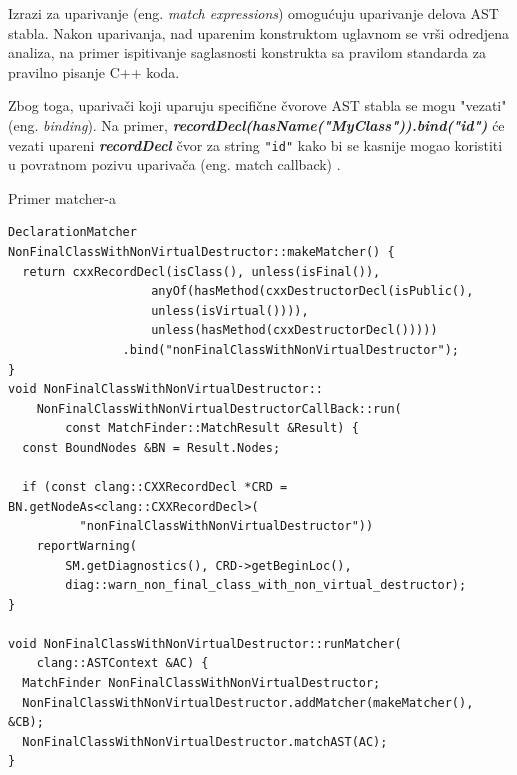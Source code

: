 \documentclass[12pt,oneside]{memoir}
\begin{document}
Izrazi za uparivanje (eng. \textit{match expressions}) omogu\'{c}uju uparivanje delova AST stabla. Nakon uparivanja, nad uparenim konstruktom uglavnom se vr\v{s}i odredjena analiza, na primer ispitivanje saglasnosti konstrukta sa pravilom standarda za pravilno pisanje C++ koda.
\par
Zbog toga, upariva\v{c}i koji uparuju specifi\v{c}ne čvorove AST stabla se mogu "vezati" (eng. \textit{binding}). Na primer, \textbf{\textit{recordDecl(hasName("MyClass")).bind("id")}} će vezati upareni \textbf{\textit{recordDecl}} čvor za string \texttt{"id"} kako bi se kasnije mogao koristiti u povratnom pozivu upariva\v{c}a (eng. match callback) \cite{matchers}.

\begin{primer}
Primer matcher-a 
\end{primer}
\begin{lstlisting}[caption={Primer matcher-a (koji pronalazi sve klase koje nisu obeležene atributom \texttt{final} i čiji destruktor nije virtuelan), CallBack klase i poziva matchera},frame=single, label=simple]
DeclarationMatcher NonFinalClassWithNonVirtualDestructor::makeMatcher() {
  return cxxRecordDecl(isClass(), unless(isFinal()),
                    anyOf(hasMethod(cxxDestructorDecl(isPublic(),
                    unless(isVirtual()))),
                    unless(hasMethod(cxxDestructorDecl()))))
                .bind("nonFinalClassWithNonVirtualDestructor");
}
void NonFinalClassWithNonVirtualDestructor::
    NonFinalClassWithNonVirtualDestructorCallBack::run(
        const MatchFinder::MatchResult &Result) {
  const BoundNodes &BN = Result.Nodes;
  
  if (const clang::CXXRecordDecl *CRD = BN.getNodeAs<clang::CXXRecordDecl>(
          "nonFinalClassWithNonVirtualDestructor"))
    reportWarning(
        SM.getDiagnostics(), CRD->getBeginLoc(),
        diag::warn_non_final_class_with_non_virtual_destructor);
}

void NonFinalClassWithNonVirtualDestructor::runMatcher(
    clang::ASTContext &AC) {
  MatchFinder NonFinalClassWithNonVirtualDestructor;
  NonFinalClassWithNonVirtualDestructor.addMatcher(makeMatcher(), &CB);
  NonFinalClassWithNonVirtualDestructor.matchAST(AC);
}
\end{lstlisting}
\end{document}
